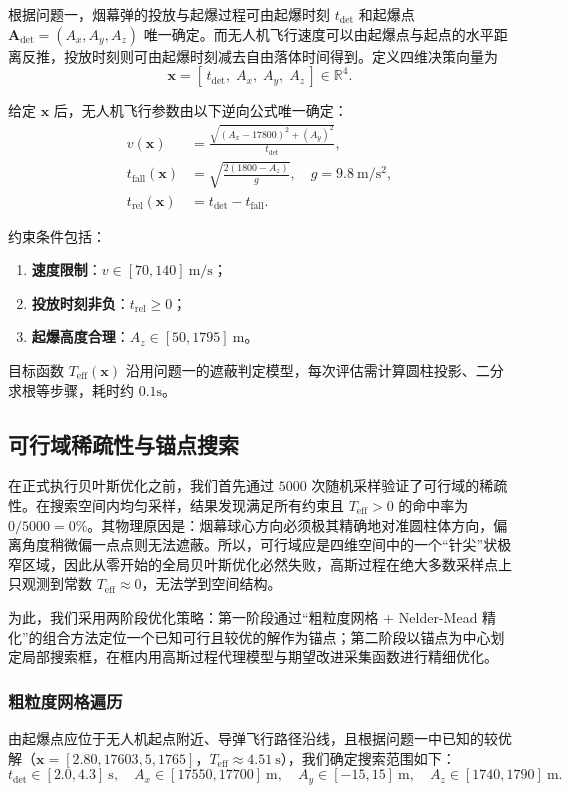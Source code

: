 \documentclass{ctexart}
\begin{document}
根据问题一，烟幕弹的投放与起爆过程可由起爆时刻 $t_{\text{det}}$ 和起爆点 $\mathbf{A}_{\text{det}}=(A_x,A_y,A_z)$ 唯一确定。而无人机飞行速度可以由起爆点与起点的水平距离反推，投放时刻则可由起爆时刻减去自由落体时间得到。定义四维决策向量为
\[
\mathbf{x} = [\,t_{\text{det}},\; A_x,\; A_y,\; A_z\,] \in \mathbb{R}^4.
\]

给定 $\mathbf{x}$ 后，无人机飞行参数由以下逆向公式唯一确定：
\begin{align}
v(\mathbf{x}) &= \frac{\sqrt{(A_x - 17800)^2 + (A_y)^2}}{t_{\text{det}}}, \label{eq:v_rev} \\
t_{\text{fall}}(\mathbf{x}) &= \sqrt{\frac{2(1800 - A_z)}{g}}, \quad g = 9.8\ \mathrm{m/s^2}, \\
t_{\text{rel}}(\mathbf{x}) &= t_{\text{det}} - t_{\text{fall}}.
\end{align}

约束条件包括：
\begin{enumerate}
    \item \textbf{速度限制}：$v \in [70, 140]\ \mathrm{m/s}$；
    \item \textbf{投放时刻非负}：$t_{\text{rel}} \geq 0$；
    \item \textbf{起爆高度合理}：$A_z \in [50, 1795]\ \mathrm{m}$。
\end{enumerate}

目标函数 $T_{\text{eff}}(\mathbf{x})$ 沿用问题一的遮蔽判定模型，每次评估需计算圆柱投影、二分求根等步骤，耗时约 $0.1\mathrm{s}$。

\subsection{可行域稀疏性与锚点搜索}

在正式执行贝叶斯优化之前，我们首先通过 $5000$ 次随机采样验证了可行域的稀疏性。在搜索空间内均匀采样，结果发现满足所有约束且 $T_{\text{eff}}>0$ 的命中率为 $0/5000=0\%$。其物理原因是：烟幕球心方向必须极其精确地对准圆柱体方向，偏离角度稍微偏一点点则无法遮蔽。所以，可行域应是四维空间中的一个“针尖”状极窄区域，因此从零开始的全局贝叶斯优化必然失败，高斯过程在绝大多数采样点上只观测到常数 $T_{\text{eff}}\approx 0$，无法学到空间结构。

为此，我们采用两阶段优化策略：第一阶段通过“粗粒度网格 + Nelder-Mead 精化”的组合方法定位一个已知可行且较优的解作为锚点；第二阶段以锚点为中心划定局部搜索框，在框内用高斯过程代理模型与期望改进采集函数进行精细优化。

\subsubsection{粗粒度网格遍历}
由起爆点应位于无人机起点附近、导弹飞行路径沿线，且根据问题一中已知的较优解（$\mathbf{x}=[2.80, 17603, 5, 1765]$，$T_{\text{eff}}\approx 4.51\ \mathrm{s}$），我们确定搜索范围如下：
\[
t_{\text{det}} \in [2.0, 4.3]\ \mathrm{s},\quad A_x \in [17550, 17700]\ \mathrm{m},\quad A_y \in [-15, 15]\ \mathrm{m},\quad A_z \in [1740, 1790]\ \mathrm{m}.
\]
\end{document}

